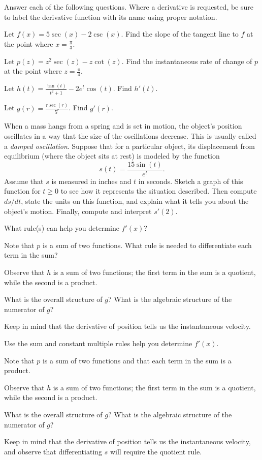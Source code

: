 \begin{activity} \label{A:2.4.3}  Answer each of the following questions.  Where a derivative is requested, be sure to label the derivative function with its name using proper notation.
\ba
	\item  Let $f(x) = 5 \sec(x) - 2\csc(x)$.  Find the slope of the tangent line to $f$ at the point where $x =\frac{\pi}{3}$.
	\item Let $p(z) = z^2\sec(z) - z\cot(z)$.  Find the instantaneous rate of change of $p$ at the point where $z = \frac{\pi}{4}$.
        \item Let $h(t) = \displaystyle \frac{\tan (t)}{t^2+1} - 2e^t \cos(t)$.  Find $h'(t)$.
        \item Let $g(r) = \displaystyle \frac{r \sec(r) }{5^r}$.  Find $g'(r)$.
        \item When a mass hangs from a spring and is set in motion, the object's position oscillates in a way that the size of the oscillations decrease.  This is usually called a \emph{damped oscillation}.  Suppose that for a particular object, its displacement from equilibrium (where the object sits at rest) is modeled by the function $$s(t) = \frac{15 \sin(t)}{e^t}.$$
Assume that $s$ is measured in inches and $t$ in seconds.  Sketch a graph of this function for $t \ge 0$ to see how it represents the situation described.  Then compute $ds/dt$, state the units on this function, and explain what it tells you about the object's motion.  Finally, compute and interpret $s'(2)$.
\ea
\end{activity}
\begin{smallhint}
\ba
	\item  What rule(s) can help you determine $f'(x)$?
	\item Note that $p$ is a sum of two functions.  What rule is needed to differentiate each term in the sum?
	\item Observe that $h$ is a sum of two functions; the first term in the sum is a quotient, while the second is a product.
        \item What is the overall structure of $g$?  What is the algebraic structure of the numerator of $g$?
        \item Keep in mind that the derivative of position tells us the instantaneous velocity.
\ea
\end{smallhint}
\begin{bighint}
\ba
	\item Use the sum and constant multiple rules help you determine $f'(x)$.
	\item Note that $p$ is a sum of two functions and that each term in the sum is a product.
	\item Observe that $h$ is a sum of two functions; the first term in the sum is a quotient, while the second is a product.
        \item What is the overall structure of $g$?  What is the algebraic structure of the numerator of $g$?
        \item Keep in mind that the derivative of position tells us the instantaneous velocity, and observe that differentiating $s$ will require the quotient rule.
\ea
\end{bighint}
